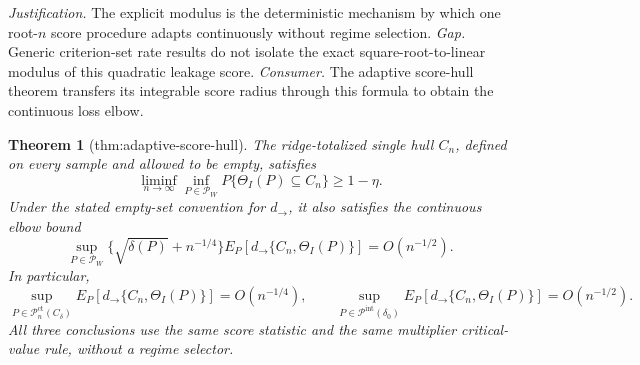 \documentclass{article}
\newtheorem{theorem}{Theorem}
\begin{document}
\par\smallskip\noindent \textit{Justification.} The explicit modulus is the deterministic mechanism by which one root-\(n\) score procedure adapts continuously without regime selection. \textit{Gap.} Generic criterion-set rate results do not isolate the exact square-root-to-linear modulus of this quadratic leakage score. \textit{Consumer.} The adaptive score-hull theorem transfers its integrable score radius through this formula to obtain the continuous loss elbow.

\begin{theorem}[thm:adaptive-score-hull]\label{thm:adaptive-score-hull}
The ridge-totalized single hull \(C_n\), defined on every sample and allowed to be empty, satisfies
\[
 \liminf_{n\to\infty}\inf_{P\in\mathcal P_W}
 P\{\Theta_I(P)\subseteq C_n\}\geq1-\eta. \tag{1}
\]
Under the stated empty-set convention for \(d_{\to}\), it also satisfies the continuous elbow bound
\[
 \sup_{P\in\mathcal P_W}
 \{\sqrt{\delta(P)}+n^{-1/4}\}
 E_P[d_{\to}\{C_n,\Theta_I(P)\}]=O(n^{-1/2}). \tag{2}
\]
In particular,
\[
 \sup_{P\in\mathcal P_n^{\mathrm{ct}}(C_\delta)}
 E_P[d_{\to}\{C_n,\Theta_I(P)\}]=O(n^{-1/4}),
 \qquad
 \sup_{P\in\mathcal P^{\mathrm{int}}(\delta_0)}
 E_P[d_{\to}\{C_n,\Theta_I(P)\}]=O(n^{-1/2}). \tag{3}
\]
All three conclusions use the same score statistic and the same multiplier critical-value rule, without a regime selector.
\end{theorem}
\end{document}
